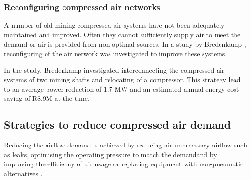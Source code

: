 		\subsubsection{Reconfiguring compressed air networks}
			A number of old mining compressed air systems  have not been adequately maintained and improved. Often they cannot sufficiently supply air to meet the demand or air is provided from non optimal sources. In a study by Bredenkamp \cite{Bredenkamp2013Masters}, reconfiguring of the air network was investigated to improve these systems.
			\par  
			In the study, Bredenkamp investigated interconnecting the compressed air systems of two mining shafts and relocating of a compressor. This strategy lead to an average power reduction of 1.7 MW and an estimated annual energy cost saving of R8.9M at the time.
			
	\subsection{Strategies to reduce compressed air demand}
	Reducing the airflow demand is achieved by reducing air unnecessary airflow such as leaks, optimising the operating pressure to match the demand\footnotemark[2] and by improving the efficiency of air usage or replacing equipment with non-pneumatic alternatives \cite{Snyman2011Masters}.
